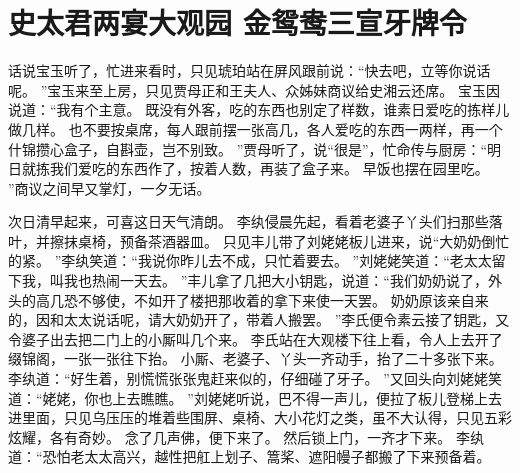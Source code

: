 \chapter{史太君两宴大观园 \quad 金鸳鸯三宣牙牌令}
\par
{}\par
话说宝玉听了，忙进来看时，只见琥珀站在屏风跟前说：“快去吧，立等你说话呢。
”宝玉来至上房，只见贾母正和王夫人、众姊妹商议给史湘云还席。
宝玉因说道：“我有个主意。
既没有外客，吃的东西也别定了样数，谁素日爱吃的拣样儿做几样。
也不要按桌席，每人跟前摆一张高几，各人爱吃的东西一两样，再一个什锦攒心盒子，自斟壶，岂不别致。
”贾母听了，说“很是”，忙命传与厨房：“明日就拣我们爱吃的东西作了，按着人数，再装了盒子来。
早饭也摆在园里吃。
”商议之间早又掌灯，一夕无话。
\par
次日清早起来，可喜这日天气清朗。
李纨侵晨先起，看着老婆子丫头们扫那些落叶，并擦抹桌椅，预备茶酒器皿。
只见丰儿带了刘姥姥板儿进来，说“大奶奶倒忙的紧。
”李纨笑道：“我说你昨儿去不成，只忙着要去。
”刘姥姥笑道：“老太太留下我，叫我也热闹一天去。
”丰儿拿了几把大小钥匙，说道：“我们奶奶说了，外头的高几恐不够使，不如开了楼把那收着的拿下来使一天罢。
奶奶原该亲自来的，因和太太说话呢，请大奶奶开了，带着人搬罢。
”李氏便令素云接了钥匙，又令婆子出去把二门上的小厮叫几个来。
李氏站在大观楼下往上看，令人上去开了缀锦阁，一张一张往下抬。
小厮、老婆子、丫头一齐动手，抬了二十多张下来。
李纨道：“好生着，别慌慌张张鬼赶来似的，仔细碰了牙子。
”又回头向刘姥姥笑道：“姥姥，你也上去瞧瞧。
”刘姥姥听说，巴不得一声儿，便拉了板儿登梯上去进里面，只见乌压压的堆着些围屏、桌椅、大小花灯之类，虽不大认得，只见五彩炫耀，各有奇妙。
念了几声佛，便下来了。
然后锁上门，一齐才下来。
李纨道：“恐怕老太太高兴，越性把舡上划子、篙桨、遮阳幔子都搬了下来预备着。
